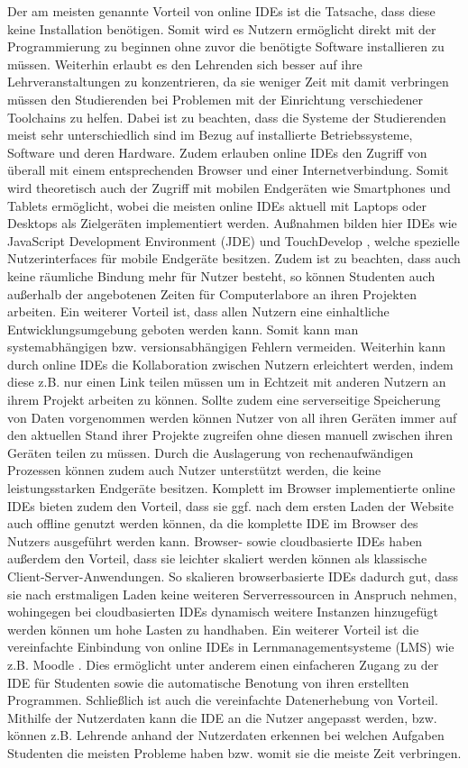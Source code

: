Der am meisten genannte Vorteil von online IDEs ist die Tatsache, dass diese keine Installation benötigen. Somit wird es Nutzern ermöglicht direkt mit der Programmierung zu beginnen ohne zuvor die benötigte Software installieren zu müssen. Weiterhin erlaubt es den Lehrenden sich besser auf ihre Lehrveranstaltungen zu konzentrieren, da sie weniger Zeit mit damit verbringen müssen den Studierenden bei Problemen mit der Einrichtung verschiedener Toolchains zu helfen. Dabei ist zu beachten, dass die Systeme der Studierenden meist sehr unterschiedlich sind im Bezug auf installierte Betriebssysteme, Software und deren Hardware. Zudem erlauben online IDEs den Zugriff von überall mit einem entsprechenden Browser und einer Internetverbindung. Somit wird theoretisch auch der Zugriff mit mobilen Endgeräten wie Smartphones und Tablets ermöglicht, wobei die meisten online IDEs aktuell mit Laptops oder Desktops als Zielgeräten implementiert werden. Außnahmen bilden hier IDEs wie JavaScript Development Environment (JDE) \cite{uehara_javascript_2019} und TouchDevelop \cite{ball_beyond_2015}, welche spezielle Nutzerinterfaces für mobile Endgeräte besitzen. Zudem ist zu beachten, dass auch keine räumliche Bindung mehr für Nutzer besteht, so können Studenten auch außerhalb der angebotenen Zeiten für Computerlabore an ihren Projekten arbeiten.  Ein weiterer Vorteil ist, dass allen Nutzern eine einhaltliche Entwicklungsumgebung geboten werden kann. Somit kann man systemabhängigen bzw. versionsabhängigen Fehlern vermeiden. Weiterhin kann durch online IDEs die Kollaboration zwischen Nutzern erleichtert werden, indem diese z.B. nur einen Link teilen müssen um in Echtzeit mit anderen Nutzern an ihrem Projekt arbeiten zu können. Sollte zudem eine serverseitige Speicherung von Daten vorgenommen werden können Nutzer von all ihren Geräten immer auf den aktuellen Stand ihrer Projekte zugreifen ohne diesen manuell zwischen ihren Geräten teilen zu müssen. Durch die Auslagerung von rechenaufwändigen Prozessen können zudem auch Nutzer unterstützt werden, die keine leistungsstarken Endgeräte besitzen. Komplett im Browser implementierte online IDEs bieten zudem den Vorteil, dass sie ggf. nach dem ersten Laden der Website auch offline genutzt werden können, da die komplette IDE im Browser des Nutzers ausgeführt werden kann.  Browser- sowie cloudbasierte IDEs haben außerdem den Vorteil, dass sie leichter skaliert werden können als klassische Client-Server-Anwendungen. So skalieren browserbasierte IDEs dadurch gut, dass sie nach erstmaligen Laden keine weiteren Serverressourcen in Anspruch nehmen, wohingegen bei cloudbasierten IDEs dynamisch weitere Instanzen hinzugefügt werden können um hohe Lasten zu handhaben. Ein weiterer Vorteil ist die vereinfachte Einbindung von online IDEs in Lernmanagementsysteme (LMS) wie z.B. Moodle . Dies ermöglicht unter anderem einen einfacheren Zugang zu der IDE für Studenten sowie die automatische Benotung von ihren erstellten Programmen.  Schließlich ist auch die vereinfachte Datenerhebung von Vorteil. Mithilfe der Nutzerdaten kann die IDE an die Nutzer angepasst werden, bzw. können z.B. Lehrende anhand der Nutzerdaten erkennen bei welchen Aufgaben Studenten die meisten Probleme haben bzw. womit sie die meiste Zeit verbringen. 